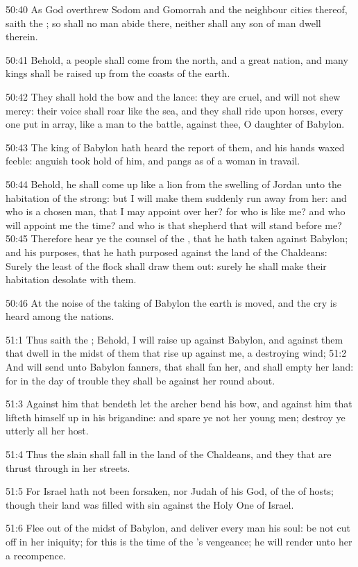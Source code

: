 50:40 As God overthrew Sodom and Gomorrah and the neighbour cities
thereof, saith the \LORD; so shall no man abide there, neither shall
any son of man dwell therein.

50:41 Behold, a people shall come from the north, and a great nation,
and many kings shall be raised up from the coasts of the earth.

50:42 They shall hold the bow and the lance: they are cruel, and will
not shew mercy: their voice shall roar like the sea, and they shall
ride upon horses, every one put in array, like a man to the battle,
against thee, O daughter of Babylon.

50:43 The king of Babylon hath heard the report of them, and his hands
waxed feeble: anguish took hold of him, and pangs as of a woman in
travail.

50:44 Behold, he shall come up like a lion from the swelling of Jordan
unto the habitation of the strong: but I will make them suddenly run
away from her: and who is a chosen man, that I may appoint over her?
for who is like me? and who will appoint me the time? and who is that
shepherd that will stand before me?  50:45 Therefore hear ye the
counsel of the \LORD, that he hath taken against Babylon; and his
purposes, that he hath purposed against the land of the Chaldeans:
Surely the least of the flock shall draw them out: surely he shall
make their habitation desolate with them.

50:46 At the noise of the taking of Babylon the earth is moved, and
the cry is heard among the nations.

51:1 Thus saith the \LORD; Behold, I will raise up against Babylon, and
against them that dwell in the midst of them that rise up against me,
a destroying wind; 51:2 And will send unto Babylon fanners, that shall
fan her, and shall empty her land: for in the day of trouble they
shall be against her round about.

51:3 Against him that bendeth let the archer bend his bow, and against
him that lifteth himself up in his brigandine: and spare ye not her
young men; destroy ye utterly all her host.

51:4 Thus the slain shall fall in the land of the Chaldeans, and they
that are thrust through in her streets.

51:5 For Israel hath not been forsaken, nor Judah of his God, of the
\LORD of hosts; though their land was filled with sin against the Holy
One of Israel.

51:6 Flee out of the midst of Babylon, and deliver every man his soul:
be not cut off in her iniquity; for this is the time of the \LORD's
vengeance; he will render unto her a recompence.

